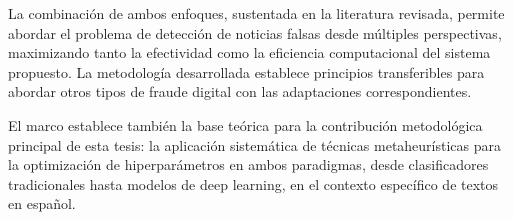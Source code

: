 La combinación de ambos enfoques, sustentada en la literatura revisada, permite abordar el problema de detección de noticias falsas desde múltiples perspectivas, maximizando tanto la efectividad como la eficiencia computacional del sistema propuesto. La metodología desarrollada establece principios transferibles para abordar otros tipos de fraude digital con las adaptaciones correspondientes.

El marco establece también la base teórica para la contribución metodológica principal de esta tesis: la aplicación sistemática de técnicas metaheurísticas para la optimización de hiperparámetros en ambos paradigmas, desde clasificadores tradicionales hasta modelos de deep learning, en el contexto específico de textos en español.